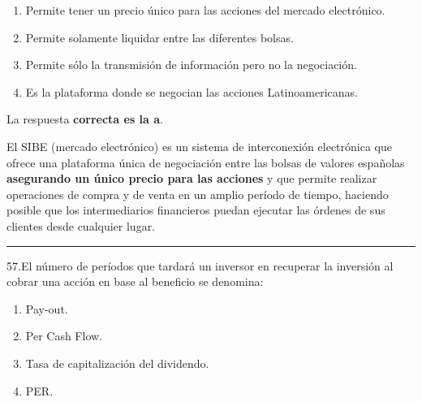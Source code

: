 \documentclass[
  letterpaper,
  DIV=11,
  numbers=noendperiod]{scrreprt}
\begin{document}
\begin{enumerate}
\def\labelenumi{\alph{enumi})}
\item
  Permite tener un precio único para las acciones del mercado
  electrónico.
\item
  Permite solamente liquidar entre las diferentes bolsas.
\item
  Permite sólo la transmisión de información pero no la negociación.
\item
  Es la plataforma donde se negocian las acciones Latinoamericanas.
\end{enumerate}

\begin{tcolorbox}[enhanced jigsaw, left=2mm, opacityback=0, colback=white, breakable, arc=.35mm, bottomrule=.15mm, rightrule=.15mm, toprule=.15mm, leftrule=.75mm, colframe=quarto-callout-tip-color-frame]
\begin{minipage}[t]{5.5mm}
\textcolor{quarto-callout-tip-color}{\faLightbulb}
\end{minipage}%
\begin{minipage}[t]{\textwidth - 5.5mm}

La respuesta \textbf{correcta es la a}.

El SIBE (mercado electrónico) es un sistema de interconexión electrónica
que ofrece una plataforma única de negociación entre las bolsas de
valores españolas \textbf{asegurando un único precio para las acciones}
y que permite realizar operaciones de compra y de venta en un amplio
período de tiempo, haciendo posible que los intermediarios financieros
puedan ejecutar las órdenes de sus clientes desde cualquier lugar.

\end{minipage}%
\end{tcolorbox}

\begin{center}\rule{0.5\linewidth}{0.5pt}\end{center}

57.El número de períodos que tardará un inversor en recuperar la
inversión al cobrar una acción en base al beneficio se denomina:

\begin{enumerate}
\def\labelenumi{\alph{enumi})}
\item
  Pay-out.
\item
  Per Cash Flow.
\item
  Tasa de capitalización del dividendo.
\item
  PER.
\end{enumerate}
\end{document}
